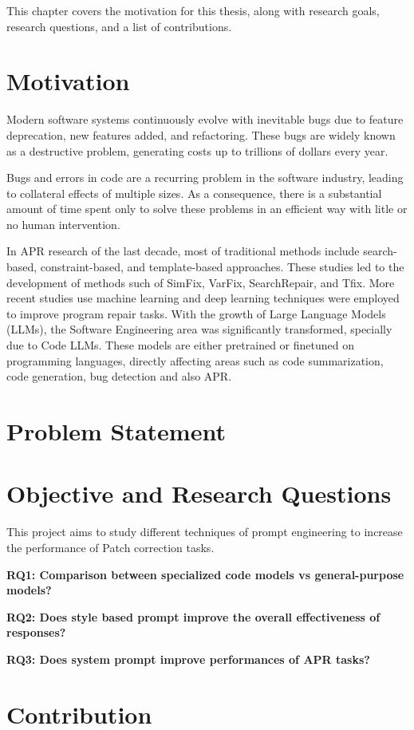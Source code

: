 This chapter covers the motivation for this thesis, along with research goals, research
questions, and a list of contributions.

\section{Motivation}
Modern software systems continuously evolve with inevitable bugs due to feature deprecation, new features added, and refactoring. These bugs are widely known as a destructive problem, generating costs up to trillions of dollars every year.%

Bugs and errors in code are a recurring problem in the software industry, leading to collateral effects of multiple sizes. %
As a consequence, there is a substantial amount of time spent only to solve these problems in an efficient way with litle or no human intervention.

In APR research of the last decade, most of traditional methods include search-based, constraint-based, and template-based approaches.%
These studies led to the development of methods such of SimFix, VarFix, SearchRepair, and Tfix.
More recent studies use machine learning and deep learning techniques were employed to improve program repair tasks.
With the growth of Large Language Models (LLMs), the Software Engineering area was significantly transformed, specially due to Code LLMs. These models are either pretrained or finetuned on programming languages, directly affecting areas such as code summarization, code generation, bug detection and also APR.






\section{Problem Statement}


\section{Objective and Research Questions} 
This project aims to study different techniques of prompt engineering to increase the performance of Patch correction tasks.

\textbf{RQ1: Comparison between specialized code models vs general-purpose models?}

\textbf{RQ2: Does style based prompt improve the overall effectiveness of responses?}

\textbf{RQ3: Does system prompt improve performances of APR tasks?}


\section{Contribution}